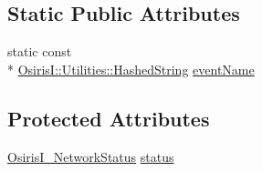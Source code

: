 \subsection*{Static Public Attributes}
\begin{DoxyCompactItemize}
\item 
static const \\*
\hyperlink{class_osiris_i_1_1_utilities_1_1_hashed_string}{Osiris\-I\-::\-Utilities\-::\-Hashed\-String} \hyperlink{struct_osiris_i_1_1_events_1_1_osiris_i___network_status_event_a18ac0b938dfa57851e24080173a109fa}{event\-Name}
\end{DoxyCompactItemize}
\subsection*{Protected Attributes}
\begin{DoxyCompactItemize}
\item 
\hyperlink{namespace_osiris_i_1_1_events_ab333d7f608a8f84b9c3fa0c1f7517e78}{Osiris\-I\-\_\-\-Network\-Status} \hyperlink{struct_osiris_i_1_1_events_1_1_osiris_i___network_status_event_a37129c546f0b1f7771ee633b05934860}{status}
\end{DoxyCompactItemize}


